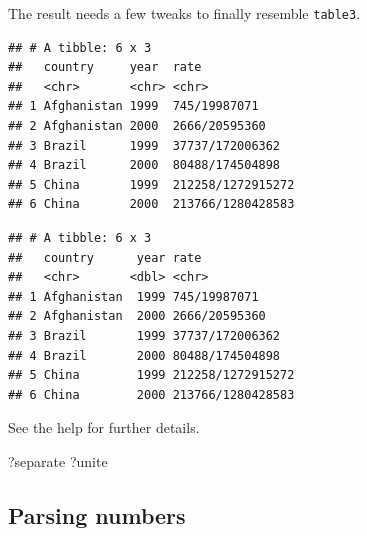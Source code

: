 \documentclass[]{book}
\newenvironment{Shaded}{}{}
\newcommand{\DataTypeTok}[1]{#1}
\newcommand{\KeywordTok}[1]{\textcolor[rgb]{0.00,0.00,1.00}{#1}}
\newcommand{\NormalTok}[1]{#1}
\newcommand{\OperatorTok}[1]{#1}
\newcommand{\StringTok}[1]{\textcolor[rgb]{0.00,0.50,0.50}{#1}}
\begin{document}
The result needs a few tweaks to finally resemble \texttt{table3}.

\begin{Shaded}
\end{Shaded}

\begin{verbatim}
## # A tibble: 6 x 3
##   country     year  rate             
##   <chr>       <chr> <chr>            
## 1 Afghanistan 1999  745/19987071     
## 2 Afghanistan 2000  2666/20595360    
## 3 Brazil      1999  37737/172006362  
## 4 Brazil      2000  80488/174504898  
## 5 China       1999  212258/1272915272
## 6 China       2000  213766/1280428583
\end{verbatim}

\begin{Shaded}
\end{Shaded}

\begin{verbatim}
## # A tibble: 6 x 3
##   country      year rate             
##   <chr>       <dbl> <chr>            
## 1 Afghanistan  1999 745/19987071     
## 2 Afghanistan  2000 2666/20595360    
## 3 Brazil       1999 37737/172006362  
## 4 Brazil       2000 80488/174504898  
## 5 China        1999 212258/1272915272
## 6 China        2000 213766/1280428583
\end{verbatim}

See the help for further details.

\begin{Shaded}
\begin{Highlighting}[]
\NormalTok{?separate}
\NormalTok{?unite}
\end{Highlighting}
\end{Shaded}

\hypertarget{parsing-numbers}{%
\subsection{Parsing numbers}\label{parsing-numbers}}
\end{document}
